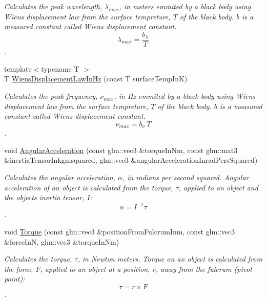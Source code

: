 \begin{DoxyCompactItemize}
\begin{DoxyCompactList}\small\item\em Calculates the peak wavelength, $\lambda_{max}$, in meters emmited by a black body using Wien\textquotesingle{}s displacement law from the surface tempreture, $T$ of the black body. $b$ is a measured constant called Wien\textquotesingle{}s displacement constant. \[\lambda_{max} = \dfrac{b_\lambda}{T} \]. \end{DoxyCompactList}\item 
{\footnotesize template$<$typename T $>$ }\\T \mbox{\hyperlink{group___e_g_x_phys-_electrodynamics-_black_body-_wiens_displacement_law_gaf09ffbc9b7133c16da786c1609ecf689}{Wiens\+Displacement\+Law\+In\+Hz}} (const T surface\+Temp\+InK)
\begin{DoxyCompactList}\small\item\em Calculates the peak frequency, $\nu_{max}$, in Hz emmited by a black body using Wien\textquotesingle{}s displacement law from the surface tempreture, $T$ of the black body. $b$ is a measured constant called Wien\textquotesingle{}s displacement constant. \[\nu_{max} = b_\nu\ T \]. \end{DoxyCompactList}\item 
void \mbox{\hyperlink{group___e_g_x_phys-_kinetics-_angular_acceleration_gaf636e9a30f3db4e170829efbf40efbbe}{Angular\+Acceleration}} (const glm\+::vec3 \&torque\+In\+Nm, const glm\+::mat3 \&inertia\+Tensor\+Inkgmsquared, glm\+::vec3 \&angular\+Acceleration\+Inrad\+Pers\+Squared)
\begin{DoxyCompactList}\small\item\em Calculates the angular acceleration, $\alpha$, in radians per second squared. Angular acceleration of an object is calculated from the torque, $\tau$, applied to an object and the object\textquotesingle{}s inertia tensor, $I$\+: \[\alpha=I^{-1} \tau \]. \end{DoxyCompactList}\item 
void \mbox{\hyperlink{group___e_g_x_phys-_kinetics-_torque_ga12a787853cab88d40412c8290ca41c61}{Torque}} (const glm\+::vec3 \&position\+From\+Fulcrum\+Inm, const glm\+::vec3 \&force\+InN, glm\+::vec3 \&torque\+In\+Nm)
\begin{DoxyCompactList}\small\item\em Calculates the torque, $\tau$, in Newton meters. Torque on an object is calculated from the force, $F$, applied to an object at a position, $r$, away from the fulcrum (pivot point)\+: \[\tau=r \times F \]. \end{DoxyCompactList}\item 

\end{DoxyCompactItemize}
